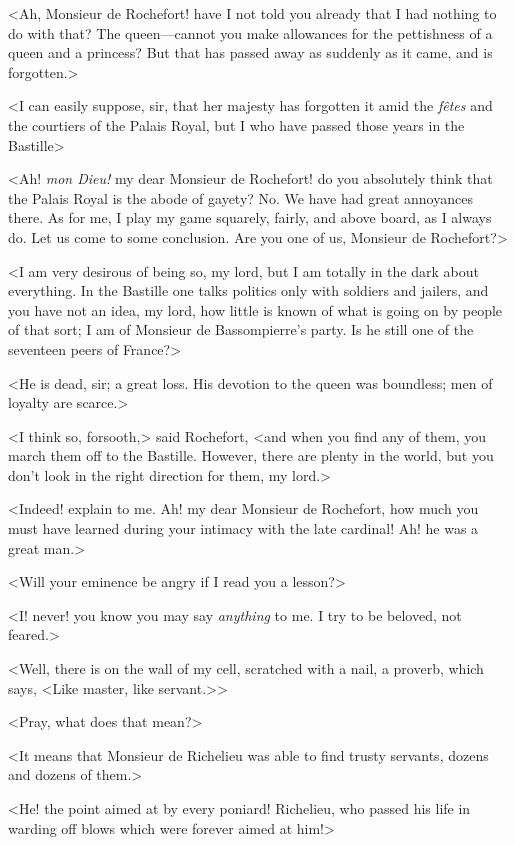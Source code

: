 <Ah, Monsieur de Rochefort! have I not told you already that I had nothing to do with that? The queen—cannot you make allowances for the pettishness of a queen and a princess? But that has passed away as suddenly as it came, and is forgotten.>

<I can easily suppose, sir, that her majesty has forgotten it amid the \textit{fêtes} and the courtiers of the Palais Royal, but I who have passed those years in the Bastille\longdash>

<Ah! \textit{mon Dieu!} my dear Monsieur de Rochefort! do you absolutely think that the Palais Royal is the abode of gayety? No. We have had great annoyances there. As for me, I play my game squarely, fairly, and above board, as I always do. Let us come to some conclusion. Are you one of us, Monsieur de Rochefort?>

<I am very desirous of being so, my lord, but I am totally in the dark about everything. In the Bastille one talks politics only with soldiers and jailers, and you have not an idea, my lord, how little is known of what is going on by people of that sort; I am of Monsieur de Bassompierre's party. Is he still one of the seventeen peers of France?>

<He is dead, sir; a great loss. His devotion to the queen was boundless; men of loyalty are scarce.>

<I think so, forsooth,> said Rochefort, <and when you find any of them, you march them off to the Bastille. However, there are plenty in the world, but you don't look in the right direction for them, my lord.>

<Indeed! explain to me. Ah! my dear Monsieur de Rochefort, how much you must have learned during your intimacy with the late cardinal! Ah! he was a great man.>

<Will your eminence be angry if I read you a lesson?>

<I! never! you know you may say \textit{anything} to me. I try to be beloved, not feared.>

<Well, there is on the wall of my cell, scratched with a nail, a proverb, which says, <Like master, like servant.>>

<Pray, what does that mean?>

<It means that Monsieur de Richelieu was able to find trusty servants, dozens and dozens of them.>

<He! the point aimed at by every poniard! Richelieu, who passed his life in warding off blows which were forever aimed at him!>

